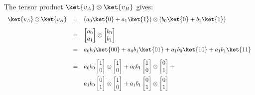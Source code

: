 The tensor product $\ket{v_{A}} \otimes \ket{v_{B}}$ gives:
\begin{equation}
    \begin{array}{rcl}
        \ket{v_{A}} \otimes \ket{v_{B}} &=& \left( a_{0} \ket{0} + a_{1} \ket{1} \right) \otimes \left( b_{0} \ket{0} + b_{1} \ket{1} \right)   \\ [.8em]
                                        &=& \begin{bmatrix} a_{0} \\ a_{1} \end{bmatrix} \otimes \begin{bmatrix} b_{0} \\ b_{1} \end{bmatrix}   \\ [1.2em]
                                        &=& a_{0}b_{0} \ket{00} + a_{0}b_{1} \ket{01} + a_{1}b_{0} \ket{10} + a_{1}b_{1} \ket{11}               \\ [1em]
                                        &=& a_{0}b_{0} \begin{bmatrix} 1 \\ 0 \end{bmatrix} \otimes \begin{bmatrix} 1 \\ 0 \end{bmatrix} +
                                            a_{0}b_{1} \begin{bmatrix} 1 \\ 0 \end{bmatrix} \otimes \begin{bmatrix} 0 \\ 1 \end{bmatrix} +      \\ [1em]
                                        & & a_{1}b_{0} \begin{bmatrix} 0 \\ 1 \end{bmatrix} \otimes \begin{bmatrix} 1 \\ 0 \end{bmatrix} +
                                            a_{1}b_{1} \begin{bmatrix} 0 \\ 1 \end{bmatrix} \otimes \begin{bmatrix} 0 \\ 1 \end{bmatrix}        \\ [1.2em]

\end{array}
\end{equation}
